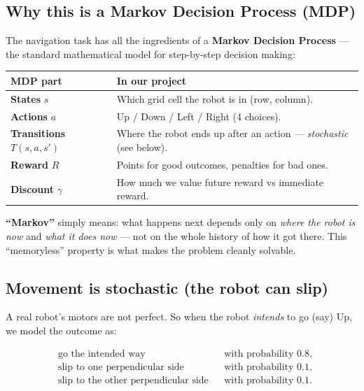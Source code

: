 \documentclass[11pt]{article}
\begin{document}
\subsection{Why this is a Markov Decision Process (MDP)}

The navigation task has all the ingredients of a \textbf{Markov Decision
Process} --- the standard mathematical model for step-by-step decision making:

\begin{center}
\renewcommand{\arraystretch}{1.3}
\begin{tabular}{@{}p{2.6cm} p{11cm}@{}}
\toprule
\textbf{MDP part} & \textbf{In our project} \\
\midrule
\textbf{States} $s$ & Which grid cell the robot is in (row, column). \\
\textbf{Actions} $a$ & Up / Down / Left / Right (4 choices). \\
\textbf{Transitions} $T(s,a,s')$ & Where the robot ends up after an action ---
\emph{stochastic} (see below). \\
\textbf{Reward} $R$ & Points for good outcomes, penalties for bad ones. \\
\textbf{Discount} $\gamma$ & How much we value future reward vs immediate reward. \\
\bottomrule
\end{tabular}
\end{center}

\textbf{``Markov''} simply means: what happens next depends only on \emph{where
the robot is now} and \emph{what it does now} --- not on the whole history of how
it got there. This ``memoryless'' property is what makes the problem cleanly
solvable.

\subsection{Movement is stochastic (the robot can slip)}

A real robot's motors are not perfect. So when the robot \emph{intends} to go
(say) Up, we model the outcome as:

\begin{equation}
\begin{aligned}
&\text{go the intended way} && \text{with probability } 0.8,\\
&\text{slip to one perpendicular side} && \text{with probability } 0.1,\\
&\text{slip to the other perpendicular side} && \text{with probability } 0.1.
\end{aligned}
\end{equation}
\end{document}
